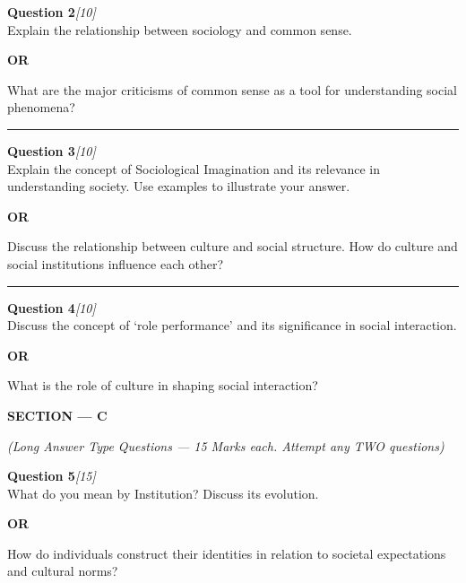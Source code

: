 \documentclass[11pt,a4paper]{article}
\newcommand{\pts}[1]{\hfill   \textit{[#1]}}
\begin{document}
\noindent   \textbf{Question 2}\pts{10} \\
Explain the relationship between sociology and common sense.


\begin{center}   \textbf{OR}\end{center}

What are the major criticisms of common sense as a tool for understanding social phenomena?

\medskip\rule{\linewidth}{0.2pt}\medskip




\noindent   \textbf{Question 3}\pts{10} \\
Explain the concept of Sociological Imagination and its relevance in understanding society. Use examples to illustrate your answer.


\begin{center}   \textbf{OR}\end{center}

Discuss the relationship between culture and social structure. How do culture and social institutions influence each other?

\medskip\rule{\linewidth}{0.2pt}\medskip




\noindent   \textbf{Question 4}\pts{10} \\
Discuss the concept of `role performance' and its significance in social interaction.


\begin{center}   \textbf{OR}\end{center}

What is the role of culture in shaping social interaction?

\bigskip

\begin{center}
   \textbf{\large SECTION --- C}
\end{center}
   \textit{(Long Answer Type Questions --- 15 Marks each. Attempt any TWO questions)}
\bigskip




\noindent   \textbf{Question 5}\pts{15} \\
What do you mean by Institution? Discuss its evolution.


\begin{center}   \textbf{OR}\end{center}

How do individuals construct their identities in relation to societal expectations and cultural norms?
\end{document}

